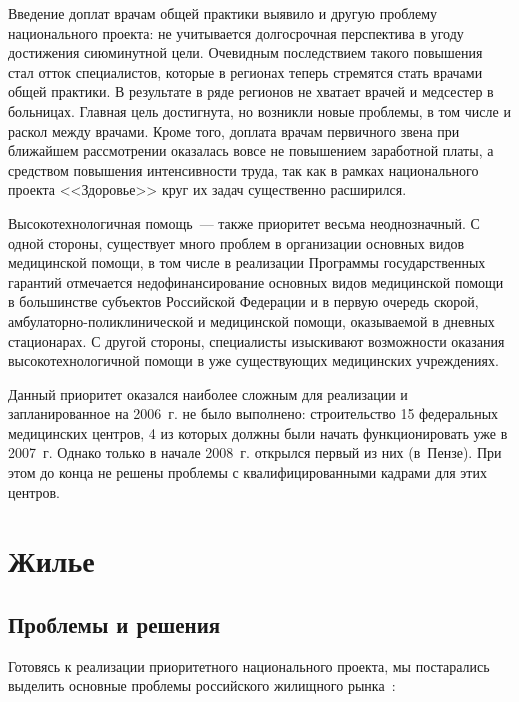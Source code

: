 \documentclass[article, 12pt, russian, oneside]{ncc}
\begin{document}
Введение доплат врачам общей практики выявило и другую проблему
национального проекта: не учитывается долгосрочная перспектива в угоду
достижения сиюминутной цели. Очевидным последствием такого повышения
стал отток специалистов, которые в регионах теперь стремятся стать
врачами общей практики. В результате в ряде регионов не хватает врачей
и медсестер в больницах. Главная цель достигнута, но возникли новые
проблемы, в том числе и раскол между врачами. Кроме того, доплата
врачам первичного звена при ближайшем рассмотрении оказалась вовсе не
повышением заработной платы, а средством повышения интенсивности
труда, так как в рамках национального проекта <<Здоровье>> круг их
задач существенно расширился.

Высокотехнологичная помощь~--- также приоритет весьма неоднозначный. С
одной стороны, существует много проблем в организации основных видов
медицинской помощи, в том числе в реализации Программы государственных
гарантий отмечается недофинансирование основных видов медицинской
помощи в большинстве субъектов Российской Федерации и в первую очередь
скорой, амбулаторно-поликлинической и медицинской помощи, оказываемой
в дневных стационарах. С другой стороны, специалисты изыскивают
возможности оказания высокотехнологичной помощи в уже существующих
медицинских учреждениях.

Данный приоритет оказался наиболее сложным для реализации и
запланированное на 2006~г. не было выполнено: строительство 15
федеральных медицинских центров, 4 из которых должны были начать
функционировать уже в 2007~г. Однако только в начале 2008~г. открылся
первый из них (в~Пензе).  При этом до конца не решены проблемы с
квалифицированными кадрами для этих центров.
\newpage

\section{Жилье}

\subsection{Проблемы и решения}

Готовясь к реализации приоритетного национального проекта, мы
постарались выделить основные проблемы российского жилищного
рынка~\cite{Hub_Problems}:
\end{document}
